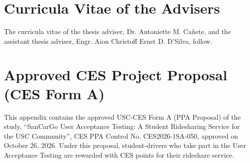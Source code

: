 \chapter{Curricula Vitae of the Advisers}\label{app:cvadv}
\noindent The curricula vitae of the thesis adviser, Dr. Antoniette M. Ca\~nete, and the assistant thesis adviser, Engr. Aion Christoff Ernst D. D'Silva, follow.

\chapter{Approved CES Project Proposal (CES Form A)}\label{app:ces}
\noindent This appendix contains the approved USC-CES Form A (PPA Proposal) of the study, ``SanCarGo User Acceptance Testing: A Student Ridesharing Service for the USC Community'', CES PPA Control No. CES2026-1SA-050, approved on October 26, 2026. Under this proposal, student-drivers who take part in the User Acceptance Testing are rewarded with CES points for their rideshare service.
\clearpage
